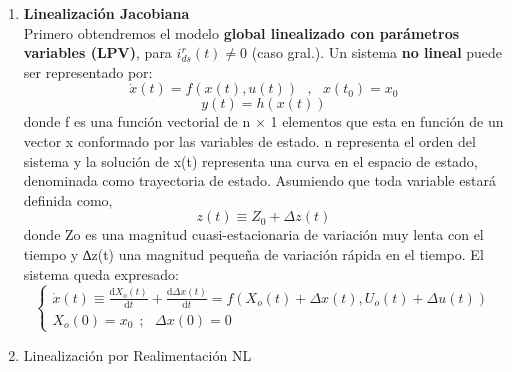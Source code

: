 \documentclass[10pt]{article}
\begin{document}
\begin{enumerate}
\begin{itemize}
	\end{itemize}
	\nextpage %
    \item \textbf{Linealización Jacobiana}
    \vspace{0.3cm} 
    \\Primero obtendremos el modelo \textbf{global linealizado con parámetros variables (LPV)}, para $ i_{ds}^{r}\left( t \right ) \neq 0 $ (caso gral.). 
    Un sistema \textbf{no lineal} puede ser representado por:
    \begin{equation}
        \dot{x}\left ( t \right )= f\left ( x\left ( t \right ),u\left ( t \right ) \right ) \ \ \ ,\ \ \ x\left ( t_{0} \right )=x_{0}
    \end{equation}
    \begin{equation}
        y\left ( t \right )=h\left ( x\left ( t \right ) \right )
    \end{equation}
    donde f es una función vectorial de n × 1 elementos que esta en función de un vector x conformado por las variables de estado.
    n representa el orden del sistema y la solución de x(t) representa una curva en el espacio de estado, denominada como trayectoria de estado.
    Asumiendo que toda variable estará definida como,
    \begin{equation}
        z\left ( t \right )\equiv Z_{0} + \Delta z\left ( t \right )
    \end{equation}
    donde Zo es una magnitud cuasi-estacionaria de variación muy lenta con el tiempo y ∆z(t) una magnitud pequeña de variación rápida en el tiempo.
    El sistema queda expresado:
    \begin{equation}
        \begin{cases}
            \dot{x}\left ( t \right )\equiv
            \frac{\mathrm{d} X_{o}\left ( t \right )}{\mathrm{d} t}+
            \frac{\mathrm{d} \Delta x\left ( t \right )}{\mathrm{d} t}
            =
            f\left ( X_{o}\left ( t \right )+\Delta x\left ( t \right ),U_{o}\left ( t \right )+\Delta u\left ( t \right ) \right )
            \\
            X_{o}\left ( 0 \right )=x_{0}\ \ ;\ \ \ \Delta x\left ( 0 \right )=0
        \end{cases}
    \end{equation}

    \item Linealización por Realimentación NL
    \begin{itemize}
    

\end{itemize}
\end{enumerate}
\end{document}
